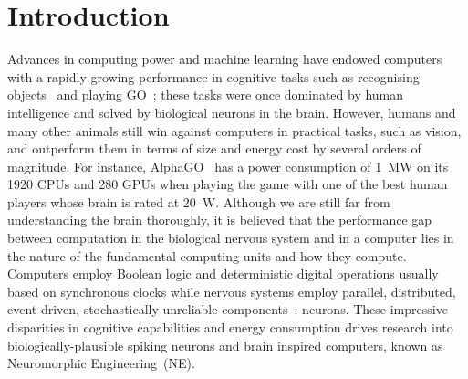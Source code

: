 \chapter{Introduction}
\label{cha:intro}



Advances in computing power and machine learning have endowed computers with a rapidly growing performance in cognitive tasks such as recognising objects~\citep{deng2009imagenet} and playing GO~\citep{silver2016mastering};
these tasks were once dominated by human intelligence and solved by biological neurons in the brain.
However, humans and many other animals still win against computers in practical tasks, such as vision, and outperform them in terms of size and energy cost by several orders of magnitude.
For instance, AlphaGO~\citep{silver2016mastering} has a power consumption of 1~MW on its 1920 CPUs and 280 GPUs when playing the game with one of the best human players whose brain is rated at 20~W.
Although we are still far from understanding the brain thoroughly, it is believed that the performance gap between computation in the biological nervous system and in a computer lies in the nature of the fundamental computing units and how they compute.
Computers employ Boolean logic and deterministic digital operations usually based on synchronous clocks while nervous systems employ parallel, distributed, event-driven, stochastically unreliable components~\citep{indiveri2009artificial}: neurons.
These impressive disparities in cognitive capabilities and energy consumption drives research into biologically-plausible spiking neurons and brain inspired computers, known as Neuromorphic Engineering~(NE).




